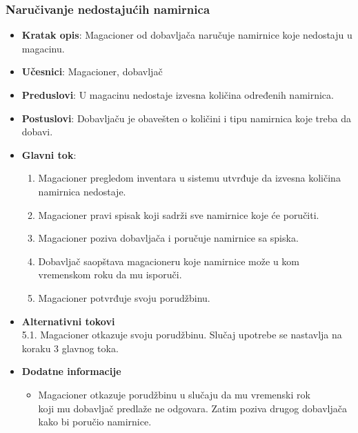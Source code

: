 \subsubsection{Naručivanje nedostajućih namirnica}
   \begin{itemize}
    \item \textbf{Kratak opis}:
   Magacioner od dobavljača naručuje namirnice koje nedostaju u magacinu.
    \item \textbf{Učesnici}:
    Magacioner, dobavljač
    \item \textbf{Preduslovi}:
    U magacinu nedostaje izvesna količina određenih namirnica.
    \item \textbf{Postuslovi}:
    Dobavljaču je obavešten o količini i tipu namirnica koje treba da dobavi. 
    \item \textbf{Glavni tok}:
    \begin{enumerate}
        \item Magacioner pregledom inventara u sistemu utvrđuje da izvesna količina namirnica nedostaje.
        \item Magacioner pravi spisak koji sadrži sve namirnice koje će poručiti.
        \item Magacioner poziva dobavljača i poručuje namirnice sa spiska.
        \item Dobavljač saopštava magacioneru koje namirnice može u kom vremenskom roku da mu isporuči.
        \item Magacioner potvrđuje svoju porudžbinu.
    \end{enumerate}
\item \textbf{Alternativni tokovi}\\
        5.1. Magacioner otkazuje svoju porudžbinu. Slučaj upotrebe se na\-stavlja na koraku 3 glavnog toka.
 
 \item \textbf{Dodatne informacije}
 \begin{itemize}
     \item 
    Magacioner otkazuje porudžbinu u slučaju da mu vremenski rok\\ koji mu dobavljač predlaže ne odgovara. Zatim poziva drugog dobavljača kako bi poručio namirnice.

 \end{itemize}
 \end{itemize}
 
 

